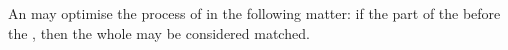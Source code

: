 An  may optimise the  process of  in the following matter: if the part of the  before the  , then the whole  may be considered matched. \\

